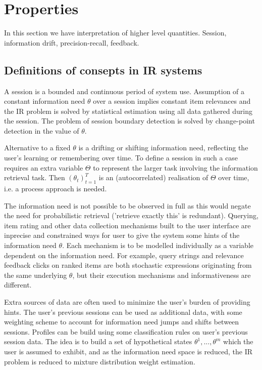 \documentclass[10pt]{article}
\begin{document}
\section{Properties}

In this section we have interpretation of higher level quantities. Session, information drift, precision-recall, feedback.

\subsection{Definitions of consepts in IR systems}
A session is a bounded and continuous period of system use. Assumption of a constant information need $\theta$ over a session implies constant item relevances and the IR problem is solved by statistical estimation using all data gathered during the session. The problem of session boundary detection is solved by change-point detection in the value of $\theta$. 

Alternative to a fixed $\theta$ is a drifting or shifting information need, reflecting the user's learning or remembering over time. To define a session in such a case requires an extra variable $\Theta$ to represent the larger task involving the information retrieval task. Then $(\theta_t)_{t=1}^T$ is an (autocorrelated) realisation of $\Theta$ over time, i.e. a process approach is needed.

The information need is not possible to be observed in full as this would negate the need for probabilistic retrieval ('retrieve exactly this' is redundant). Querying, item rating and other data collection mechanisms built to the user interface are inprecise and constrained ways for user to give the system some hints of the information need $\theta$. Each mechanism is to be modelled individually as a variable dependent on the information need. For example, query strings and relevance feedback clicks on ranked items are both stochastic expressions originating from the same underlying $\theta$, but their execution mechanisms and informativeness are different.

Extra sources of data are often used to minimize the user's burden of providing hints. The user's previous sessions can be used as additional data, with some weighting scheme to account for information need jumps and shifts between sessions. Profiles can be build using some classification rules on user's previous session data. The idea is to build a set of hypothetical states $\theta^1, ..., \theta^m$ which the user is assumed to exhibit, and as the information need space is reduced, the IR problem is reduced to mixture distribution weight estimation.
\end{document}
